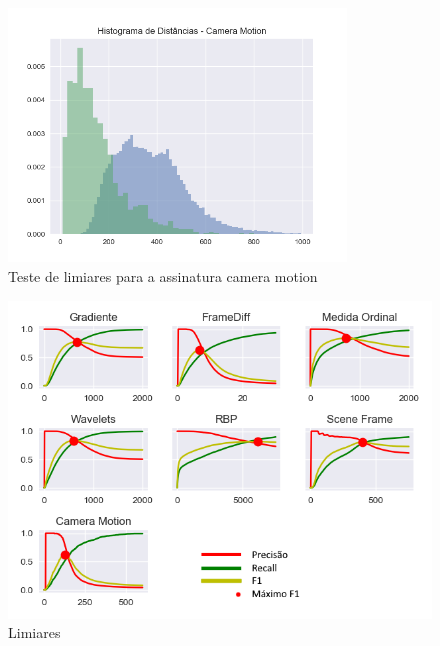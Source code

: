 \begin{figure}[h]
	\centering
	\label{fig:limiares-camera-motion}
	\caption{Teste de limiares para a assinatura camera motion}
	\includegraphics[width=0.8\textwidth]{dados/figuras/experimentos/histograma_Camera_Motion.png}
\end{figure}

\begin{figure}[h]
	\centering
	\label{fig:limiares}
	\caption{Limiares}
	\includegraphics[width=\textwidth]{dados/figuras/experimentos/todos_final.png}
\end{figure}

